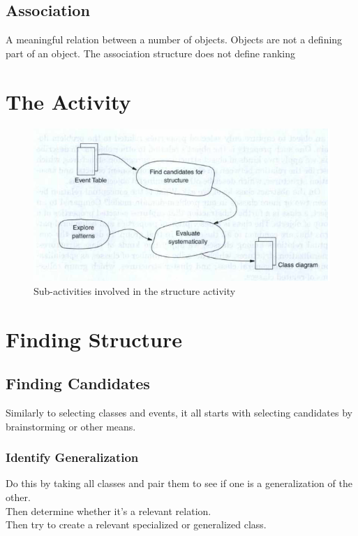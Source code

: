\subsection*{Association}
A meaningful relation between a number of objects. Objects are not a defining part of an object. The association structure does not define ranking

\section{The Activity}
\begin{figure}[H]
    \center
    \includegraphics[width=\linewidth*3/4]{parts/2_problem_domain_analysis/structure/figures/structure_activity.png}
    \caption{Sub-activities involved in the structure activity \ooad[74]}
    \label{fig:structure_structure_activity}
\end{figure}

\section{Finding Structure \ooad[79]}
\subsection*{Finding Candidates}
Similarly to selecting classes and events, it all starts with selecting candidates by brainstorming or other means.

\subsubsection*{Identify Generalization \ooad[80]}
Do this by taking all classes and pair them to see if one is a generalization of the other. \\
Then determine whether it's a relevant relation.\\
Then try to create a relevant specialized or generalized class.

